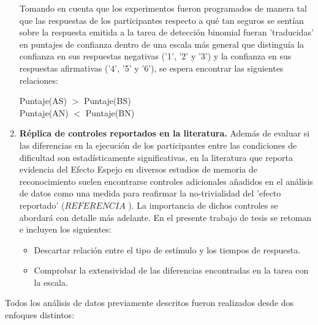 \begin{enumerate}
Tomando en cuenta que los experimentos fueron programados de manera tal que las respuestas de los participantes respecto a qué tan seguros se sentían sobre la respuesta emitida a la tarea de detección binomial fueran 'traducidas' en puntajes de confianza dentro de una escala más general que distinguía la confianza en sus respuestas negativas ('1', '2' y '3') y la confianza en sus respuestas afirmativas ('4', '5' y '6'), se espera encontrar las siguientes relaciones: \\
\begin{center}
Puntaje(AS) $>$ Puntaje(BS)\\
Puntaje(AN) $<$ Puntaje(BN)\\
\end{center}

\item \textbf{Réplica de controles reportados en la literatura.}
Además de evaluar si las diferencias en la ejecución de los participantes entre las condiciones de dificultad son estadísticamente significativas, en la literatura que reporta evidencia del Efecto Espejo en diversos estudios de memoria de reconocimiento suelen encontrarse controles adicionales añadidos en el análisis de datos como una medida para reafirmar la no-trivialidad del 'efecto reportado' ($REFERENCIA$ ). La importancia de dichos controles se abordará con detalle más adelante. En el presente trabajo de tesis se retoman e incluyen los siguientes:
	\begin{itemize}
	\item Descartar relación entre el tipo de estímulo y los tiempos de respuesta.
	\item Comprobar la extensividad de las diferencias encontradas en la tarea con la escala.
	\end{itemize}
\end{enumerate}

Todos los análisis de datos previamente descritos fueron realizados desde dos enfoques distintos:\\


